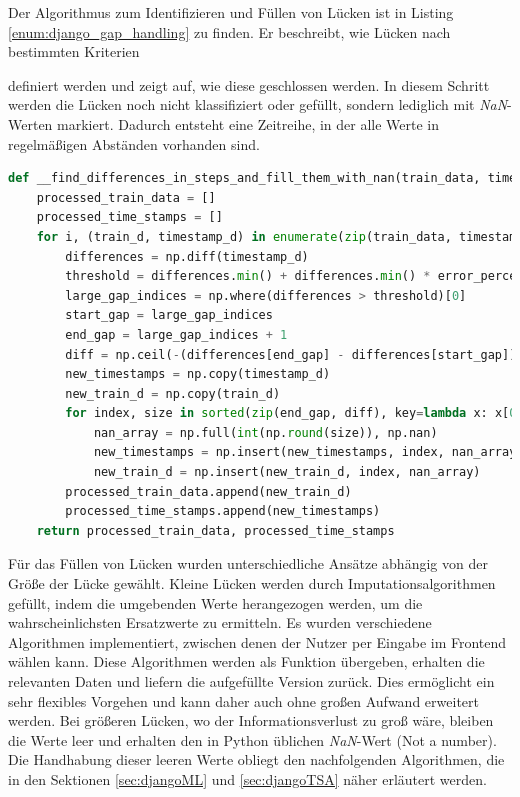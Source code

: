 Der Algorithmus zum Identifizieren und Füllen von Lücken ist in Listing \ref{enum:django_gap_handling} zu finden. Er beschreibt, wie Lücken nach bestimmten Kriterien 

definiert werden und zeigt auf, wie diese geschlossen werden. In diesem Schritt werden die Lücken noch nicht klassifiziert oder gefüllt, sondern lediglich mit \textit{NaN}-Werten markiert. Dadurch entsteht eine Zeitreihe, in der alle Werte in regelmäßigen Abständen vorhanden sind.

\begin{lstlisting}[language=Python, caption={Algorithmus zum Auffüllen von Lücken}, label={code:djangoAlgoGap}]
def __find_differences_in_steps_and_fill_them_with_nan(train_data, timestamps_normalized):
    processed_train_data = []
    processed_time_stamps = []
    for i, (train_d, timestamp_d) in enumerate(zip(train_data, timestamps_normalized)):
        differences = np.diff(timestamp_d)
        threshold = differences.min() + differences.min() * error_percentage
        large_gap_indices = np.where(differences > threshold)[0]
        start_gap = large_gap_indices
        end_gap = large_gap_indices + 1
        diff = np.ceil(-(differences[end_gap] - differences[start_gap]) / threshold)
        new_timestamps = np.copy(timestamp_d)
        new_train_d = np.copy(train_d)
        for index, size in sorted(zip(end_gap, diff), key=lambda x: x[0], reverse=True):
            nan_array = np.full(int(np.round(size)), np.nan)
            new_timestamps = np.insert(new_timestamps, index, nan_array)
            new_train_d = np.insert(new_train_d, index, nan_array)
        processed_train_data.append(new_train_d)
        processed_time_stamps.append(new_timestamps)
    return processed_train_data, processed_time_stamps
\end{lstlisting}

Für das Füllen von Lücken wurden unterschiedliche Ansätze abhängig von der Größe der Lücke gewählt. Kleine Lücken werden durch Imputationsalgorithmen gefüllt, indem die umgebenden Werte herangezogen werden, um die wahrscheinlichsten Ersatzwerte zu ermitteln. 
Es wurden verschiedene Algorithmen implementiert, zwischen denen der Nutzer per Eingabe im Frontend wählen kann. Diese Algorithmen werden als Funktion übergeben, erhalten die relevanten Daten und liefern die aufgefüllte Version zurück. Dies ermöglicht ein sehr 
flexibles Vorgehen und kann daher auch ohne großen Aufwand erweitert werden. Bei größeren Lücken, wo der Informationsverlust zu groß wäre, bleiben die Werte leer und erhalten den in Python üblichen \textit{NaN}-Wert (Not a number). Die Handhabung dieser leeren Werte obliegt den nachfolgenden Algorithmen, die in den Sektionen \ref{sec:djangoML} und \ref{sec:djangoTSA} näher erläutert werden.

